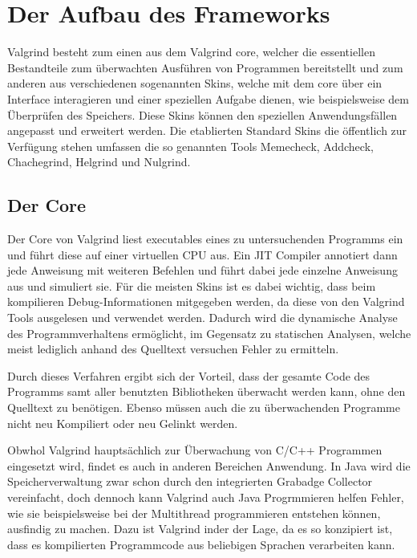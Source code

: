 \section{Der Aufbau des Frameworks}
Valgrind besteht zum einen aus dem Valgrind core, welcher die essentiellen Bestandteile zum überwachten Ausführen von Programmen bereitstellt und zum anderen aus verschiedenen sogenannten Skins, welche mit dem core über ein Interface interagieren und einer speziellen Aufgabe dienen, wie beispielsweise dem Überprüfen des Speichers. Diese Skins können den speziellen Anwendungsfällen angepasst und erweitert werden. Die etablierten Standard Skins die öffentlich zur Verfügung stehen umfassen die so genannten Tools Memecheck, Addcheck, Chachegrind, Helgrind und Nulgrind.

\subsection{Der Core}
Der Core von Valgrind liest executables eines zu untersuchenden Programms ein und führt diese auf einer virtuellen CPU aus. Ein JIT Compiler annotiert dann jede Anweisung mit weiteren Befehlen und führt dabei jede einzelne Anweisung aus und simuliert sie. Für die meisten Skins ist es dabei wichtig, dass beim kompilieren Debug-Informationen mitgegeben werden, da diese von den Valgrind Tools ausgelesen und verwendet werden. Dadurch wird die dynamische Analyse des Programmverhaltens ermöglicht, im Gegensatz zu statischen Analysen, welche meist lediglich anhand des Quelltext versuchen Fehler zu ermitteln. \cite{heise}

Durch dieses Verfahren ergibt sich der Vorteil, dass der gesamte Code des Programms samt aller benutzten Bibliotheken überwacht werden kann, ohne den Quelltext zu benötigen.
Ebenso müssen auch die zu überwachenden Programme nicht neu Kompiliert oder neu Gelinkt werden.\cite{valarticle}

Obwhol Valgrind hauptsächlich zur Überwachung von C/C++ Programmen eingesetzt wird, findet es auch in anderen Bereichen Anwendung. In Java wird die Speicherverwaltung zwar schon durch den integrierten Grabadge Collector vereinfacht, doch dennoch kann Valgrind auch Java Progrmmieren helfen Fehler, wie sie beispielsweise bei der Multithread programmieren entstehen können, ausfindig zu machen. Dazu ist Valgrind inder der Lage, da es so konzipiert ist, dass es kompilierten Programmcode aus beliebigen Sprachen verarbeiten kann.